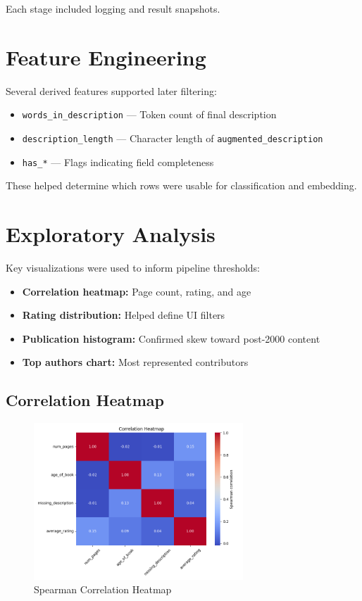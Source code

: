 Each stage included logging and result snapshots.

\section{Feature Engineering}
\label{sec:feature-engineering}

Several derived features supported later filtering:

\begin{itemize}
    \item \texttt{words\_in\_description} — Token count of final description
    \item \texttt{description\_length} — Character length of \texttt{augmented\_description}
    \item \texttt{has\_*} — Flags indicating field completeness
\end{itemize}

These helped determine which rows were usable for classification and embedding.

\section{Exploratory Analysis}
\label{sec:data-exploration}

Key visualizations were used to inform pipeline thresholds:

\begin{itemize}
    \item \textbf{Correlation heatmap:} Page count, rating, and age
    \item \textbf{Rating distribution:} Helped define UI filters
    \item \textbf{Publication histogram:} Confirmed skew toward post-2000 content
    \item \textbf{Top authors chart:} Most represented contributors
\end{itemize}

\subsection{Correlation Heatmap}
\begin{figure}[H]
    \centering
    \includegraphics[width=0.7\textwidth]{figures/correlation_heatmap.png}
    \caption{Spearman Correlation Heatmap}
    \label{fig:correlation-heatmap}
\end{figure}

